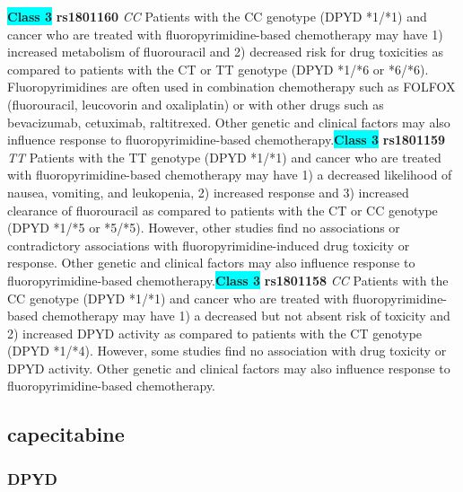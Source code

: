 \documentclass{book}
\begin{document}
\begin{center}
\textbf{\colorbox{cyan} {Class 3}} \textbf{ rs1801160 } \textit{ CC }
Patients with the CC genotype (DPYD *1/*1) and cancer who are treated with fluoropyrimidine-based chemotherapy may have 1) increased metabolism of fluorouracil and 2) decreased risk for drug toxicities as compared to patients with the CT or TT genotype (DPYD *1/*6 or *6/*6). Fluoropyrimidines are often used in combination chemotherapy such as FOLFOX (fluorouracil, leucovorin and oxaliplatin) or with other drugs such as bevacizumab, cetuximab, raltitrexed. Other genetic and clinical factors may also influence response to fluoropyrimidine-based chemotherapy.\textbf{\colorbox{cyan} {Class 3}} \textbf{ rs1801159 } \textit{ TT }
Patients with the TT genotype (DPYD *1/*1) and cancer who are treated with fluoropyrimidine-based chemotherapy may have 1) a decreased likelihood of nausea, vomiting, and leukopenia, 2) increased response and 3) increased clearance of fluorouracil as compared to patients with the CT or CC genotype (DPYD *1/*5 or *5/*5). However, other studies find no associations or contradictory associations with fluoropyrimidine-induced drug toxicity or response. Other genetic and clinical factors may also influence response to fluoropyrimidine-based chemotherapy.\textbf{\colorbox{cyan} {Class 3}} \textbf{ rs1801158 } \textit{ CC }
Patients with the CC genotype (DPYD *1/*1) and cancer who are treated with fluoropyrimidine-based chemotherapy may have 1) a decreased but not absent risk of toxicity and 2) increased DPYD activity as compared to patients with the CT genotype (DPYD *1/*4). However, some studies find no association with drug toxicity or DPYD activity. Other genetic and clinical factors may also influence response to fluoropyrimidine-based chemotherapy.


\end{center}\subsection{ capecitabine }


\subsubsection{ DPYD }
\end{document}
